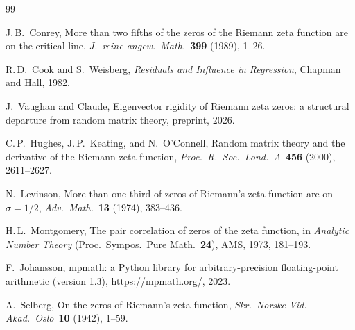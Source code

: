 \documentclass[11pt,a4paper]{article}
\begin{document}
\begin{thebibliography}{99}

J.\,B.~Conrey,
More than two fifths of the zeros of the Riemann zeta function are on the critical line,
\emph{J.~reine angew.~Math.}\ \textbf{399} (1989), 1--26.

R.\,D.~Cook and S.~Weisberg,
\emph{Residuals and Influence in Regression},
Chapman and Hall, 1982.

J.~Vaughan and Claude,
Eigenvector rigidity of Riemann zeta zeros: a structural departure from random matrix theory,
preprint, 2026.

C.\,P.~Hughes, J.\,P.~Keating, and N.~O'Connell,
Random matrix theory and the derivative of the Riemann zeta function,
\emph{Proc.\ R.\ Soc.\ Lond.\ A}\ \textbf{456} (2000), 2611--2627.

N.~Levinson,
More than one third of zeros of Riemann's zeta-function are on $\sigma = 1/2$,
\emph{Adv.\ Math.}\ \textbf{13} (1974), 383--436.

H.\,L.~Montgomery,
The pair correlation of zeros of the zeta function,
in \emph{Analytic Number Theory} (Proc.\ Sympos.\ Pure Math.\ \textbf{24}), AMS, 1973, 181--193.

F.~Johansson,
mpmath: a Python library for arbitrary-precision floating-point arithmetic (version 1.3),
\url{https://mpmath.org/}, 2023.

A.~Selberg,
On the zeros of Riemann's zeta-function,
\emph{Skr.\ Norske Vid.-Akad.\ Oslo}\ \textbf{10} (1942), 1--59.

\end{thebibliography}
\end{document}
